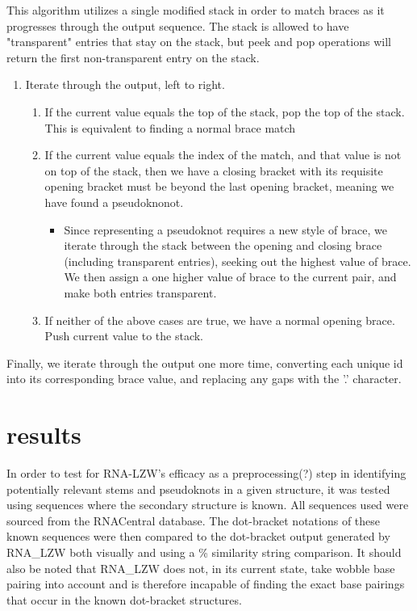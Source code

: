 \documentclass[sigconf]{acmart}
\begin{document}
This algorithm utilizes a single modified stack in order to match braces as it progresses through the output sequence. The stack is allowed to have "transparent" entries that stay on the stack, but peek and pop operations will return the first non-transparent entry on the stack.
\begin{enumerate}
	\item Iterate through the output, left to right.
		\begin{enumerate}
		\item If the current value equals the top of the stack, pop the top of the stack. This is equivalent to finding a normal brace match
		\item If the current value equals the index of the match, and that value is not on top of the stack, then we have a closing bracket with its requisite opening bracket must be beyond the last opening bracket, meaning we have found a pseudoknonot.
			\begin{itemize}
			\item Since representing a pseudoknot requires a new style of brace, we iterate through the stack between the opening and closing brace (including transparent entries), seeking out the highest value of brace. We then assign a one higher value of brace to the current pair, and make both entries transparent. 
			\end{itemize}
		\item If neither of the above cases are true, we have a normal opening brace. Push current value to the stack.
		\end{enumerate}
\end{enumerate}

Finally, we iterate through the output one more time, converting each unique id into its corresponding brace value, and replacing any gaps with the '.' character.


\section{results}

In order to test for RNA-LZW's efficacy as a preprocessing(?) step in identifying potentially relevant stems and pseudoknots in a given structure, it was tested using sequences where the secondary structure is known.  All sequences used were sourced from the RNACentral database. The dot-bracket notations of these known sequences were then compared to the dot-bracket output generated by RNA\_LZW both visually and using a \% similarity string comparison. It should also be noted that RNA\_LZW does not, in its current state, take wobble base pairing into account and is therefore incapable of finding the exact base pairings that occur in the known dot-bracket structures. 
\end{document}
